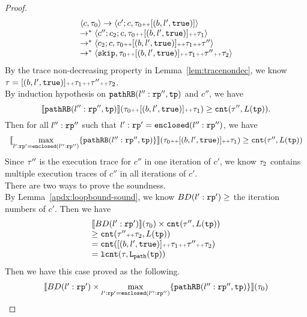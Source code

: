 \begin{proof}
\[
  \begin{array}{l}
  \langle c, \mathtt{\tau}_0 \rangle \to \langle c';c, \mathtt{\tau}_0 {\scriptscriptstyle ++} [(b, l', \mathtt{true})] \rangle \\
  \to^* \langle c'';c_2;c, \mathtt{\tau}_0 {\scriptscriptstyle ++} [(b, l', \mathtt{true})] {\scriptscriptstyle ++} \mathtt{\tau}_1 \rangle \\
  \to^* \langle c_2;c, \mathtt{\tau}_0 {\scriptscriptstyle ++} [(b, l', \mathtt{true})] {\scriptscriptstyle ++} \mathtt{\tau}_1 {\scriptscriptstyle ++} \mathtt{\tau}'' \rangle \\
  \to^* \langle \mathtt{skip}, \mathtt{\tau}_0 {\scriptscriptstyle ++} [(b, l', \mathtt{true})] {\scriptscriptstyle ++} \mathtt{\tau}_1 {\scriptscriptstyle ++} \mathtt{\tau}'' {\scriptscriptstyle ++} \mathtt{\tau}_2 \rangle
  \end{array}
\]
By the trace non-decreasing property in Lemma~\ref{lem:tracenondec},
we know $\mathtt{\tau} = [(b, l', \mathtt{true})] {\scriptscriptstyle ++} \mathtt{\tau}_1 {\scriptscriptstyle ++} \mathtt{\tau}'' {\scriptscriptstyle ++} \mathtt{\tau}_2$.
\\
By induction hypothesis on $\mathtt{pathRB}(l'':\mathtt{rp}'', \mathtt{tp})$ and $c''$, we have
\[
  \llbracket \mathtt{pathRB}(l'':\mathtt{rp}'', \mathtt{tp}) \rrbracket(\mathtt{\tau}_0 {\scriptscriptstyle ++} [(b, l', \mathtt{true})] {\scriptscriptstyle ++} \mathtt{\tau}_1) 
  \geq \mathtt{cnt}(\mathtt{\tau}'', L(\mathtt{tp})).
\]
Then for all $l'':\mathtt{rp}''$ such that $l': \mathtt{rp}' = \mathtt{enclosed}(l'':\mathtt{rp}'')$, we have 
\[
  \begin{array}{l}
  \llbracket \max\limits_{l': \mathtt{rp}' = \mathtt{enclosed}(l'':\mathtt{rp}'')} \{\mathtt{pathRB}(l'':\mathtt{rp}'', \mathtt{tp})\} \rrbracket
  (\mathtt{\tau}_0 {\scriptscriptstyle ++} [(b, l', \mathtt{true})] {\scriptscriptstyle ++} \mathtt{\tau}_1)
  \geq \mathtt{cnt}(\mathtt{\tau}'', L(\mathtt{tp}))
  \end{array}
\]
Since $\mathtt{\tau}''$ is the execution trace for $c''$ in one iteration of $c'$,
we know $\mathtt{\tau}_2$ contains multiple execution traces of  $c''$ in all iterations of $c'$.
\\
There are two ways to prove the soundness.
\\
By Lemma~\ref{apdx:loopbound-sound}, we know $BD(l':\mathtt{rp}') \geq$ the iteration numbers of $c'$. Then we have
\[
  \begin{array}{l}
  \llbracket  BD(l':\mathtt{rp}') \rrbracket(\mathtt{\tau}_0) \times \mathtt{cnt}(\mathtt{\tau}'', L(\mathtt{tp})) \\
  \geq \mathtt{cnt}(\mathtt{\tau}'' {\scriptscriptstyle ++} \mathtt{\tau}_2, L(\mathtt{tp})) \\
  = \mathtt{cnt}([(b, l', \mathtt{true})] {\scriptscriptstyle ++} \mathtt{\tau}_1 {\scriptscriptstyle ++} \mathtt{\tau}'' {\scriptscriptstyle ++} \mathtt{\tau}_2)\\
  = \mathtt{lcnt}(\mathtt{\tau}, \mathtt{L}_{\mathtt{path}}(\mathtt{tp}))
  \end{array}
\]
Then we have this case proved as the following.
\[
  \begin{array}{l}
  \llbracket  BD(l':\mathtt{rp}') \times \max\limits_{l': \mathtt{rp}' = \mathtt{enclosed}(l'':\mathtt{rp}'')} \{\mathtt{pathRB}(l'':\mathtt{rp}'', \mathtt{tp})\} \rrbracket(\mathtt{\tau}_0)\\

\end{array}\]
\end{proof}
